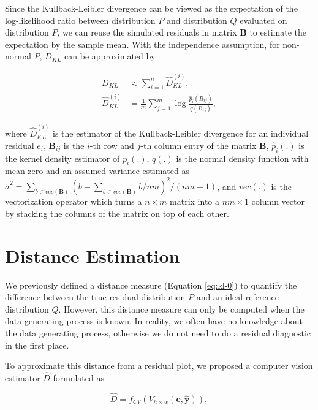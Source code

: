 \documentclass[]{interact}
\theoremstyle{plain}%
\theoremstyle{definition}
\theoremstyle{remark}
\begin{document}
Since the Kullback-Leibler divergence can be viewed as the expectation
of the log-likelihood ratio between distribution \(P\) and distribution
\(Q\) evaluated on distribution \(P\), we can reuse the simulated
residuals in matrix \(\boldsymbol{B}\) to estimate the expectation by
the sample mean. With the independence assumption, for non-normal \(P\),
\(D_{KL}\) can be approximated by

\begin{align*} \label{eq:kl-3}
D_{KL} &\approx \sum_{i = 1}^{n} \hat{D}_{KL}^{(i)}, \\
\hat{D}_{KL}^{(i)} &= \frac{1}{m}\sum_{j = 1}^{m} \log\frac{\hat{p}_i(B_{ij})}{q(B_{ij})},
\end{align*}

\noindent where \(\hat{D}_{KL}^{(i)}\) is the estimator of the
Kullback-Leibler divergence for an individual residual \(e_i\),
\(\boldsymbol{B}_{ij}\) is the \(i\)-th row and \(j\)-th column entry of
the matrix \(\boldsymbol{B}\), \(\hat{p}_i(.)\) is the kernel density
estimator of \(p_i(.)\), \(q(.)\) is the normal density function with
mean zero and an assumed variance estimated as
\(\hat{\sigma}^2 = \sum_{b \in vec(\boldsymbol{B})}(b - \sum_{b \in vec(\boldsymbol{B})} b/nm)^2/(nm - 1)\),
and \(vec(.)\) is the vectorization operator which turns a
\(n \times m\) matrix into a \(nm \times 1\) column vector by stacking
the columns of the matrix on top of each other.

\section{Distance Estimation}\label{sec-model-distance-estimation}

We previously defined a distance measure (Equation \ref{eq:kl-0}) to
quantify the difference between the true residual distribution \(P\) and
an ideal reference distribution \(Q\). However, this distance measure
can only be computed when the data generating process is known. In
reality, we often have no knowledge about the data generating process,
otherwise we do not need to do a residual diagnostic in the first place.

To approximate this distance from a residual plot, we proposed a
computer vision estimator \(\hat{D}\) formulated as

\begin{equation} \label{eq:d-approx}
\hat{D} = f_{CV}(V_{h \times w}(\boldsymbol{e}, \hat{\boldsymbol{y}})),
\end{equation}
\end{document}
